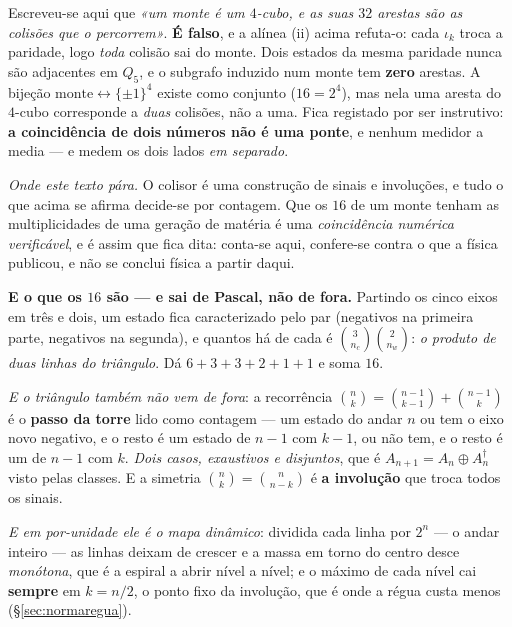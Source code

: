 \documentclass[livro.tex]{subfiles}
\begin{document}
\begin{obs}\label{obs:pontefalsa}
Escreveu-se aqui que \emph{«um monte é um $4$-cubo, e as suas $32$ arestas são as colisões que o
percorrem»}. \textbf{É falso}, e a alínea (ii) acima refuta-o: cada $\iota_k$ troca a paridade, logo
\emph{toda} colisão sai do monte. Dois estados da mesma paridade nunca são adjacentes em $Q_5$, e
o subgrafo induzido num monte tem \textbf{zero} arestas. A bijeção $\text{monte}\leftrightarrow
\{\pm1\}^4$ existe como conjunto ($16=2^4$), mas nela uma aresta do $4$-cubo corresponde a
\emph{duas} colisões, não a uma. Fica registado por ser instrutivo: \textbf{a coincidência de dois
números não é uma ponte}, e nenhum medidor a media ---  e
 medem os dois lados \emph{em separado}.
\end{obs}

\medskip
\noindent \emph{Onde este texto pára.} O colisor é uma construção de sinais e involuções, e tudo o
que acima se afirma decide-se por contagem. Que os $16$ de um monte tenham as multiplicidades de
uma geração de matéria é uma \emph{coincidência numérica verificável}, e é assim que fica dita:
conta-se aqui, confere-se contra o que a física publicou, e não se conclui física a partir daqui.

\medskip
\noindent \textbf{E o que os $16$ são --- e sai de Pascal, não de fora.} Partindo os cinco eixos em
três e dois, um estado fica caracterizado pelo par (negativos na primeira parte, negativos na
segunda), e quantos há de cada é $\binom{3}{n_c}\binom{2}{n_w}$: \emph{o produto de duas linhas do
triângulo}. Dá $6+3+3+2+1+1$ e soma $16$.

\medskip
\noindent \emph{E o triângulo também não vem de fora}: a recorrência
$\binom{n}{k}=\binom{n-1}{k-1}+\binom{n-1}{k}$ é o \textbf{passo da torre} lido como contagem --- um
estado do andar $n$ ou tem o eixo novo negativo, e o resto é um estado de $n-1$ com $k-1$, ou não
tem, e o resto é um de $n-1$ com $k$. \emph{Dois casos, exaustivos e disjuntos}, que é
$A_{n+1}=A_n\oplus A_n^{\dagger}$ visto pelas classes. E a simetria $\binom{n}{k}=\binom{n}{n-k}$ é
\textbf{a involução} que troca todos os sinais.

\medskip
\noindent \emph{E em por-unidade ele é o mapa dinâmico}: dividida cada linha por $2^n$ --- o andar
inteiro --- as linhas deixam de crescer e a massa em torno do centro desce \emph{monótona}, que é a
espiral a abrir nível a nível; e o máximo de cada nível cai \textbf{sempre} em $k=n/2$, o ponto fixo
da involução, que é onde a régua custa menos (\S\ref{sec:normaregua}).
\end{document}
